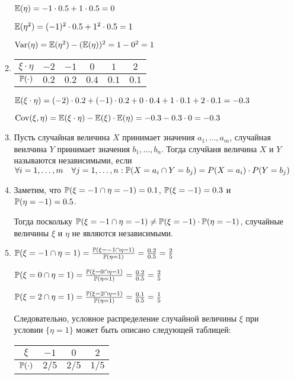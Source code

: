 \begin{enumerate}
\begin{enumerate}
$\E(\eta) = -1 \cdot 0.5 + 1 \cdot 0.5 = 0$

$\E(\eta^2) = (-1)^2 \cdot 0.5 + 1^2 \cdot 0.5 = 1$

$\Var(\eta) = \E(\eta^2)-(\E(\eta))^2 = 1 - 0^2 = 1$

\item
\begin{center}
\begin{tabular}{cccccc}
\toprule
$\xi \cdot \eta$ & $-2$ & $-1$ & $0$ & $1$ & $2$ \\ \midrule
$\P(\cdot)$ & $0.2$ & $0.2$ & $0.4$ & $0.1$ & $0.1$ \\ \bottomrule
\end{tabular}
\end{center}

$\E(\xi\cdot\eta) = (-2) \cdot 0.2 + (-1) \cdot 0.2 + 0 \cdot 0.4 + 1\cdot 0.1 + 2 \cdot 0.1 = -0.3$

$\Cov(\xi, \eta) = \E(\xi\cdot\eta) - \E(\xi)\cdot\E(\eta) = -0.3 - 0.3 \cdot 0 = -0.3$
\item Пусть случайная величина $X$ принимает значения $a_1, \ldots, a_m$, случайная веилчина $Y$ принимает значения $b_1, \ldots, b_n$. Тогда случйаня величина $X$ и $Y$ называются независимыми, если $\forall i=1, \ldots, m \quad \forall j=1, \ldots, n: \P(X = a_i \cap Y = b_j) = P(X = a_i) \cdot P(Y = b_j)$
\item Заметим, что $\P (\xi = -1 \cap \eta=-1)=0.1$, $\P(\xi=-1)=0.3$ и $\P(\eta=-1)=0.5$.

Тогда поскольку $\P (\xi = -1 \cap \eta=-1) \neq \P(\xi=-1) \cdot \P(\eta=-1)$, случайные величины $\xi$ и $\eta$ не являются независимыми.
\item $\P (\xi = -1 \cap \eta=1) = \frac{\P (\xi = -1 \cap \eta=1)}{\P(\eta=1)} = \frac{0.2}{0.5} = \frac{2}{5}$

$\P (\xi = 0 \cap \eta=1) = \frac{\P (\xi = 0 \cap \eta=1)}{\P(\eta=1)} = \frac{0.2}{0.5} = \frac{2}{5}$

$\P (\xi = 2 \cap \eta=1) = \frac{\P (\xi = 2 \cap \eta=1)}{\P(\eta=1)} = \frac{0.1}{0.5} = \frac{1}{5}$

Следовательно, условное распределение случайной величины $\xi$ при условии $\{\eta=1\}$ может быть описано следующей таблицей:

\begin{center}
\begin{tabular}{cccc}
\toprule
$\xi$ & $-1$ & $0$ & $2$ \\ \midrule
$\P(\cdot)$ & $2/5$ & $2/5$ & $1/5$ \\ \bottomrule
\end{tabular}
\end{center}


\end{enumerate}
\end{enumerate}
